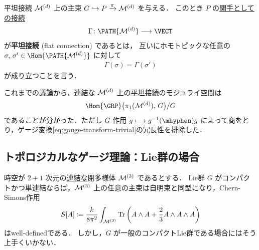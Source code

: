 \documentclass[TQFT_main]{subfiles}
\begin{document}
\begin{mydef}[label=def:flat-connection-homotopy]{平坦接続}
    $\mathcal{M}^{(d)}$ 上の主束 $G \hookrightarrow P \xrightarrow{\pi} \mathcal{M}^{(d)}$ を与える．
    このとき $P$ の\hyperref[prop:connection-functor]{関手としての接続}
    \begin{align}
        \Gamma \colon \PATH{\mfdcal{M}{d}} \lto \VECT
    \end{align}
    が\textbf{平坦接続} (flat connection) であるとは，
    互いにホモトピックな任意の $\sigma,\, \sigma' \in \Hom{\PATH{\mfdcal{M}{d}}}$ に対して
    \begin{align}
        \Gamma(\sigma) = \Gamma(\sigma')
    \end{align}
    が成り立つことを言う．
\end{mydef}

これまでの議論から，\underline{連結な} $\mathcal{M}^{(d)}$ 上の\hyperref[def:flat-connection-homotopy]{平坦接続}のモジュライ空間は
\begin{align}
    \label{eq:modulispace-of-flatconnection}
    \Hom{\GRP} \bigl( \pi_1(\mfdcal{M}{d}),\, G \bigr)/G
\end{align}
であることが分かった．ただし $G$ 作用 $g \lmto g^{-1} (\mhyphen) g$ によって商をとり，ゲージ変換\eqref{eq:gauge-transform-trivial}の冗長性を排除した．


\subsection{トポロジカルなゲージ理論：Lie群の場合}

時空が $2+1$ 次元の\underline{連結な}閉多様体 $\mathcal{M}^{(3)}$ であるとする．
Lie群 $G$ がコンパクトかつ単連結ならば，$\mathcal{M}^{(3)}$ 上の任意の主束は自明束と同型になり，Chern-Simons作用
\begin{align}
    S[A] \coloneqq \frac{k}{8\pi^2} \int_{\mathcal{M}^{(3)}} \Tr \left( A\wedge A + \frac{2}{3} A \wedge A \wedge A \right) 
\end{align}
はwell-definedである．
しかし，$G$ が一般のコンパクトLie群である場合にはそう上手くいかない．
\end{document}
